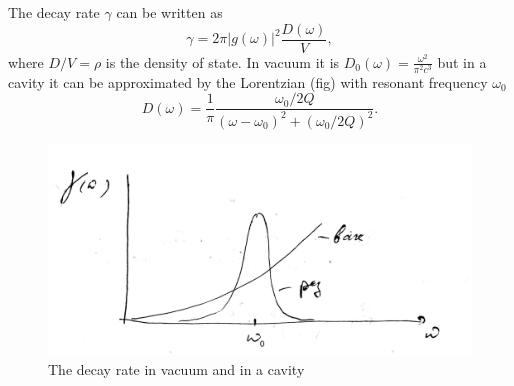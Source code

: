 The decay rate $\gamma$ can be written as
\begin{equation}
	\gamma = 2 \pi \left| g(\omega) \right|^2 \frac{D(\omega)}{V},
	\label{eq:gamma}
\end{equation}
where $D/V = \rho$ is the density of state. In vacuum it is $D_0(\omega) = \frac{\omega^2}{\pi^2 c^3}$ but in a cavity it can be approximated by the Lorentzian (fig) with resonant frequency $\omega_0$
\begin{equation}
	D(\omega) = \frac{1}{\pi} \frac{\omega_{0}/2Q}{(\omega - \omega_{0})^2 + \left( \omega_{0}/2Q \right)^2}.
\end{equation}

\begin{figure}
	\centering
	\includegraphics[width=0.5\linewidth]{fig/L10/gamma}
	\caption{The decay rate in vacuum and in a cavity}
	\label{fig:gamma}
\end{figure}

